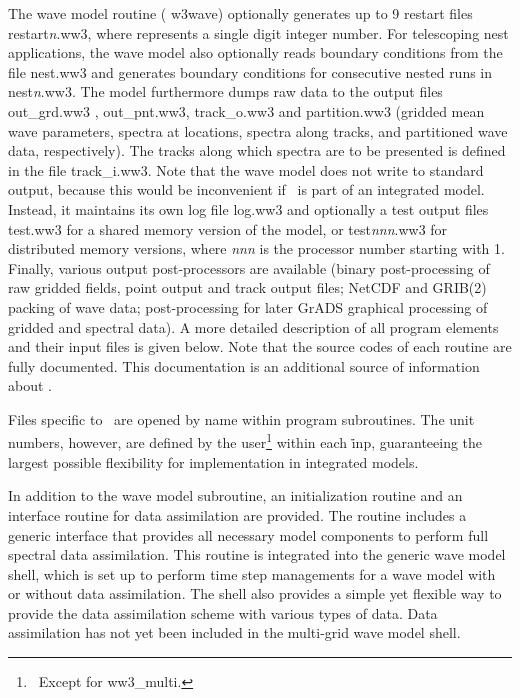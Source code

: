 The wave model routine ({\F
  w3wave}) optionally generates up to 9 restart files {\file
  restart{\em{n}}.ww3}, where {} represents a single digit
integer number. For telescoping nest applications, the wave model also 
optionally reads boundary conditions from
the file {\file nest.ww3} and generates boundary conditions for consecutive
nested runs in {\file nest{\em{n}}.ww3}. The model furthermore dumps raw data to the
output files {\file out\_grd.ww3 }, {\file out\_pnt.ww3}, {\file track\_o.ww3}
and {\file partition.ww3} (gridded mean wave parameters, spectra at locations,
spectra along tracks, and partitioned wave data, respectively). The tracks
along which spectra are to be presented is defined in the file {\file
  track\_i.ww3}. Note that the wave model does not write to standard output,
because this would be inconvenient if \ws\ is part of an integrated
model. Instead, it maintains its own log file {\file log.ww3} and optionally a
test output files {\file test.ww3} for a shared memory version of the model,
or {\file test{\em{nnn}}.ww3} for distributed memory versions, where {\em nnn}
is the processor number starting with 1.  Finally, various output
post-processors are available (binary post-processing of raw gridded fields,
point output and track output files; NetCDF and GRIB(2) packing of wave data;
post-processing for later GrADS graphical processing of gridded and spectral
data). A more detailed description of all program elements and their input
files is given below. Note that the source codes of each routine are fully
documented. This documentation is an additional source of information about
\ws.



Files specific to \ws\ are opened by name within program subroutines. The unit
numbers, however, are defined by the user\footnote{~Except for {\file
ww3\_multi}.} within each {\file \.inp}, guaranteeing the largest possible 
flexibility for implementation in integrated models.

In addition to the wave model subroutine, an initialization routine and an interface
routine for data assimilation are provided. The routine includes a
generic interface that provides all necessary model components to perform full
spectral data assimilation. This routine is integrated into the generic wave
model shell, which is set up to perform time step managements for a wave model
with or without data assimilation. The shell also provides a simple yet
flexible way to provide the data assimilation scheme with various types of
data. Data assimilation has not yet been included in the multi-grid wave model
shell.
